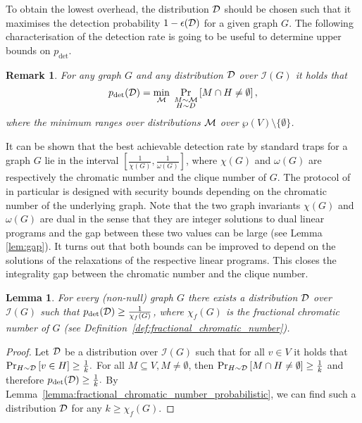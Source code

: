\documentclass[12pt]{iopart}
\renewcommand{\1}{\mathds{1}}
\newtheorem{lemma}{Lemma}
\newtheorem{remark}{Remark}
\begin{document}
To obtain the lowest overhead, the distribution $\mathcal{D}$ should be chosen such that it maximises the detection probability $1 - \epsilon(\mathcal{D})$ for a given graph $G$. 
The following characterisation of the detection rate is going to be useful to determine upper bounds on $p_\text{det}$.

\begin{remark}\label{remark:pdet_char}
  For any graph $G$ and any distribution $\mathcal{D}$ over $\mathcal I(G)$ it holds that
  \begin{align}
    p_\text{det}(\mathcal{D}) = \min_{\mathcal{M}} \;\Pr_{\substack{M \sim \mathcal{M}\\ H \sim D}} \left[ M \cap H \neq \emptyset \right],
  \end{align}
  where the minimum ranges over distributions $\mathcal{M}$ over $\wp(V) \setminus \{\emptyset\}$.
\end{remark}

It can be shown that the best achievable detection rate by standard traps for a graph $G$ lie in the interval $\left[ \frac{1}{\chi(G)} , \frac{1}{\omega(G)} \right]$, where $\chi(G)$ and $\omega(G)$ are respectively the chromatic number and the clique number of $G$. The protocol of \cite{LMKO21:verifying} in particular is designed with security bounds depending on the chromatic number of the underlying graph.
Note that the two graph invariants $\chi(G)$ and $\omega(G)$ are dual in the sense that they are integer solutions to dual linear programs and the gap between these two values can be large (see Lemma \ref{lem:gap}).
It turns out that both bounds can be improved to depend on the solutions of the relaxations of the respective linear programs.
This closes the integrality gap between the chromatic number and the clique number.

\begin{lemma}\label{lemma:lower_bound_fractional_chromatic}
  For every (non-null) graph $G$ there exists a distribution $\mathcal{D}$ over $\mathcal I(G)$ such that $p_\text{det}(\mathcal{D}) \geq \frac{1}{\chi_f(G)}$, where $\chi_f(G)$ is the fractional chromatic number of $G$ (see Definition~\ref{def:fractional_chromatic_number}).
\end{lemma}
\begin{proof}
  Let $\mathcal{D}$ be a distribution over $\mathcal I(G)$ such that for all $v \in V$ it holds that
$\Pr_{H \sim \mathcal{D}} \left[ v \in H \right] \geq \frac{1}{k}.$
For all $M \subseteq V, M \neq \emptyset$, then
$\Pr_{H \sim \mathcal{D}} \left[ M \cap H \neq \emptyset \right] \geq \frac{1}{k}$
and therefore
$p_\text{det}(\mathcal{D}) \geq \frac{1}{k}.$
By Lemma~\ref{lemma:fractional_chromatic_number_probabilistic}, we can find such a distribution $\mathcal{D}$ for any $k \geq \chi_f(G)$.
\end{proof}
\end{document}
